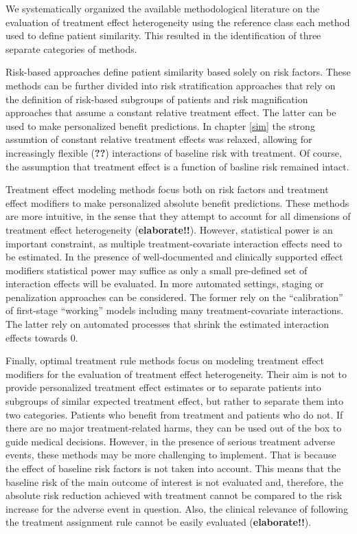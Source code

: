 \documentclass[
]{book}
\begin{document}
We systematically organized the available methodological literature on the
evaluation of treatment effect heterogeneity using the reference class each
method used to define patient similarity. This resulted in the identification of
three separate categories of methods.

Risk-based approaches define patient similarity based solely on risk
factors. These methods can be further divided into risk stratification
approaches that rely on the definition of risk-based subgroups of patients and
risk magnification approaches that assume a constant relative treatment
effect. The latter can be used to make personalized benefit predictions. In
chapter \ref{sim} the strong assumtion of constant relative treatment effects
was relaxed, allowing for increasingly flexible (\textbf{??}) interactions of
baseline risk with treatment. Of course, the assumption that treatment effect is
a function of basline risk remained intact.

Treatment effect modeling methods focus both on risk factors and treatment
effect modifiers to make personalized absolute benefit predictions. These
methods are more intuitive, in the sense that they attempt to account for all
dimensions of treatment effect heterogeneity (\textbf{elaborate!!}). However,
statistical power is an important constraint, as multiple treatment-covariate
interaction effects need to be estimated. In the presence of well-documented and
clinically supported effect modifiers statistical power may suffice as only a
small pre-defined set of interaction effects will be evaluated. In more
automated settings, staging or penalization approaches can be considered. The
former rely on the ``calibration'' of first-stage ``working'' models including many
treatment-covariate interactions. The latter rely on automated processes that
shrink the estimated interaction effects towards 0.

Finally, optimal treatment rule methods focus on modeling treatment effect
modifiers for the evaluation of treatment effect heterogeneity. Their aim is not
to provide personalized treatment effect estimates or to separate patients into
subgroups of similar expected treatment effect, but rather to separate them into
two categories. Patients who benefit from treatment and patients who do not. If
there are no major treatment-related harms, they can be used out of the box to
guide medical decisions. However, in the presence of serious treatment adverse
events, these methods may be more challenging to implement. That is because the
effect of baseline risk factors is not taken into account. This means that the
baseline risk of the main outcome of interest is not evaluated and, therefore,
the absolute risk reduction achieved with treatment cannot be compared to the
risk increase for the adverse event in question. Also, the clinical relevance of
following the treatment assignment rule cannot be easily evaluated
(\textbf{elaborate!!}).
\end{document}
